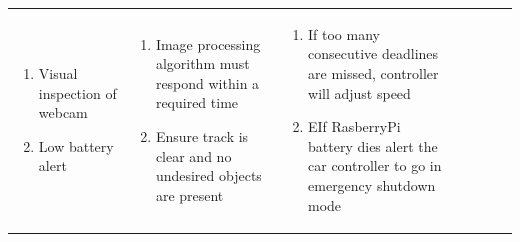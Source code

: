 \documentclass [10pt]{article}
\begin{document}
{{\begin{minipage}{\textwidth}
\begin{longtable}{ |p{ }  | p{ } |  p{ } |  p{ } | p{ } | p{ } |  p{ }|}
\begin{minipage}{.18\textwidth}
                \begin{enumerate}
                    \item Visual inspection of webcam
                    \item Low battery alert \vspace {1mm}
                \end{enumerate}
        \end{minipage}
    & \begin{minipage}{.22\columnwidth} 
                \vspace{2mm}
                \begin{enumerate}
                    \item Image processing algorithm must respond within a required time
                    \item Ensure track is clear and no undesired objects are present\vspace {1mm}
                \end{enumerate}
        \end{minipage}
    
    
    & \begin{minipage}{.24 \columnwidth} 
                \vspace{2mm}
                \begin{enumerate}
                    \item If too many consecutive deadlines are missed, controller will adjust speed
                    \item EIf RasberryPi battery dies alert the car controller to go in emergency shutdown mode\vspace {1mm}
                \end{enumerate}
        \end{minipage} \\ \cline{2-7}
    

\end{longtable}
\end{minipage}}}
\end{document}
